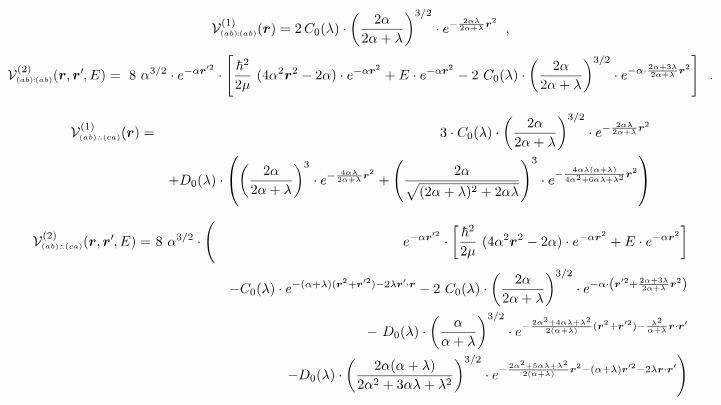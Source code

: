 \documentclass[onecolumn,preprint,superscriptaddress,nofootinbib,notitlepage,10pt,linenumbers]{revtex4-1}
\newcommand*{\mprime}{^{\prime}\mkern-1.2mu}
\newcommand{\la}{\label}
\newcommand{\be}{\begin{equation}}
\newcommand{\ee}{\end{equation}}
\newcommand{\ve}[1]{\ensuremath{\boldsymbol{#1}}}
\newcommand{\abab}{\ensuremath $(ab)\!\!:\!\!(ab)$}
\newcommand{\abca}{\ensuremath $(ab)\wasytherefore(ca)$}
\begin{document}
\begin{description}
	\item[\abab]
\be\la{eq.local.abab}
\mathcal{V}^{(1)}_{\text{\tiny\abab}}(\ve{r})=
2\,C_0(\lambda)\cdot\left(\frac{2\alpha}{2\alpha+\lambda}\right)^{3/2}\cdot
 e^{-\frac{2\alpha\lambda}{2\alpha+\lambda}\ve{r}^2}\;\;,
\ee
\be\la{eq.nonlocal.abab}
\mathcal{V}^{(2)}_{\text{\tiny\abab}}(\ve{r},\ve{r}\mprime,E)=
~8~\alpha^{3/2}\cdot e^{-\alpha\ve{r}\mprime^2}\cdot
\left[\frac{\hbar^2}{2\mu}~(4\alpha^2\ve{r}^2-2\alpha)
\cdot e^{-\alpha\ve{r}^2}+
E\cdot e^{-\alpha\ve{r}^2}
-2~C_0(\lambda)\cdot\left(\frac{2\alpha}{2\alpha+\lambda}\right)^{3/2}\cdot
 e^{-\alpha\cdot\frac{2\alpha+3\lambda}{2\alpha+\lambda}\ve{r}^2}\right]\;\;.
\ee

\item[\abca]
\begin{eqnarray}\la{eq.local.abca}
\mathcal{V}^{(1)}_{\text{\tiny\abca}}(\ve{r})&=&
3\cdot C_0(\lambda)\cdot\left(\frac{2\alpha}{2\alpha+\lambda}\right)^{3/2}\cdot
 e^{-\frac{2\alpha\lambda}{2\alpha+\lambda}\ve{r}^2}\\
&&+D_0(\lambda)\cdot\left(
\left(\frac{2\alpha}{2\alpha+\lambda}\right)^{3}\cdot e^{-\frac{4\alpha\lambda}{2\alpha+\lambda}\ve{r}^2}+
\left(\frac{2\alpha}{\sqrt{(2\alpha+\lambda)^2+2\alpha\lambda}}\right)^{3}\cdot
 e^{-\frac{4\alpha\lambda(\alpha+\lambda)}{4\alpha^2+6\alpha\lambda+\lambda^2}\ve{r}^2}
\right)
\end{eqnarray}


\begin{eqnarray}\la{eq.nonlocal.abca}
\mathcal{V}^{(2)}_{\text{\tiny\abca}}(\ve{r},\ve{r}\mprime,E)=&~8~\alpha^{3/2}\cdot\Bigg(&e^{-\alpha\ve{r}\mprime^2}\cdot
\left[\frac{\hbar^2}{2\mu}~(4\alpha^2\ve{r}^2-2\alpha)
\cdot e^{-\alpha\ve{r}^2}+
E\cdot e^{-\alpha\ve{r}^2}\right]\\
&&-C_0(\lambda)\cdot
 e^{-(\alpha+\lambda)(\ve{r}^2+\ve{r}\mprime^2)-2\lambda\ve{r}\mprime\cdot\ve{r}}
-2~C_0(\lambda)\cdot\left(\frac{2\alpha}{2\alpha+\lambda}\right)^{3/2}\cdot
 e^{-\alpha\cdot\left(\ve{r}\mprime^2+\frac{2\alpha+3\lambda}{2\alpha+\lambda}\ve{r}^2\right)}\\
 &&-~D_0(\lambda)\cdot\left(\frac{\alpha}{\alpha+\lambda}\right)^{3/2}\cdot
 e^{-\frac{2\alpha^2+4\alpha\lambda+\lambda^2}{2(\alpha+\lambda)}(\ve{r}^2+\ve{r}\mprime^2)-\frac{\lambda^2}{\alpha+\lambda}\ve{r}\cdot\ve{r}\mprime}\\
 &&-D_0(\lambda)\cdot\left(\frac{2\alpha(\alpha+\lambda)}{2\alpha^2+3\alpha\lambda+\lambda^2}\right)^{3/2}\cdot
 e^{-\frac{2\alpha^2+5\alpha\lambda+\lambda^2}{2(\alpha+\lambda)}\ve{r}^2-(\alpha+\lambda)\ve{r}\mprime^2-2\lambda\ve{r}\cdot\ve{r}\mprime}\Bigg)
\end{eqnarray}

\end{description}
\end{document}

